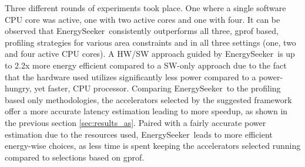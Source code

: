\documentclass[]{usiinfthesis}
\newcommand{\eseeker}{{EnergySeeker}}
\begin{document}
Three different rounds of experiments took place. One where a single software CPU core was active, one
with two active cores and one with four. It can be observed that \eseeker\ consistently outperforms all
three, gprof based, profiling strategies for various area constraints and in all three settings (one, two 
and four active CPU cores). A HW/SW approach guided by \eseeker\ is up to 2.2x more energy efficient compared to 
a SW-only approach due to the fact that the hardware used utilizes significantly less power compared to a power-hungry, yet faster, CPU processor. Comparing \eseeker\ to the profiling based only methodologies, the accelerators selected by
the suggested framework offer a more accurate latency estimation leading to more speedup, as shown in the previous section \ref{sec:results_as}. Paired with a fairly accurate power estimation due to the resources used, \eseeker\ 
leads to more efficient energy-wise choices, as less time is spent keeping the accelerators selected running compared
to selections based on gprof.
\end{document}
